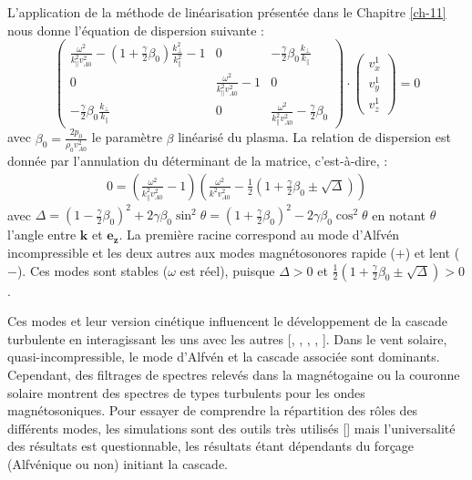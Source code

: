 L'application de la méthode de linéarisation présentée dans le Chapitre \ref{ch-11} nous donne l'équation de dispersion suivante :
\begin{equation}
    \begin{pmatrix}
\label{eq:lin_cpi_eqdis}    \frac{\omega^2}{k^2_{\parallel} v^2_{A0}} - \left(1+\frac{\gamma}{2} \beta_0\right)  \frac{k^2_{\perp}}{k^2_{\parallel}} - 1 & 0 & - \frac{\gamma}{2} \beta_0  \frac{k_{\perp}}{k_{\parallel}} \\
    0 & \frac{\omega^2}{k^2_{\parallel} v^2_{A0}} - 1  & 0 \\
     - \frac{\gamma}{2} \beta_0  \frac{k_{\perp}}{k_{\parallel}}  & 0 &\frac{\omega^2}{k^2_{\parallel} v^2_{A0}} -  \frac{\gamma}{2} \beta_0   
    \end{pmatrix} 
    \cdot \begin{pmatrix}
    v^{1}_x \\ v^{1}_y \\ v^{1}_z
    \end{pmatrix} = 0
\end{equation}
avec $\beta_0 = \frac{2p_0}{\rho_0 v^2_{A0}}$ le paramètre $\beta$ linéarisé du plasma. 
La relation de dispersion est donnée par l'annulation du déterminant de la matrice, c'est-à-dire, :
\begin{eqnarray}
 \label{eq:lin_cpi_disp}   0 = \left(\frac{\omega^2}{k^2_{\parallel} v^2_{A0}} - 1 \right)\left(\frac{\omega^2}{k^2 v^2_{A0}} - \frac{1}{2} \left(1+ \frac{\gamma}{2} \beta_0 \pm \sqrt{\Delta}\right)\right)
\end{eqnarray}
avec $\Delta = \left(1- \frac{\gamma}{2} \beta_0\right)^2 +2 \gamma \beta_0\sin^2\theta  = \left(1+ \frac{\gamma}{2} \beta_0\right)^2 -2 \gamma \beta_0\cos^2\theta$ en notant $\theta$ l'angle entre $\boldsymbol{k}$ et $\boldsymbol{e_z}$. La première racine correspond au mode d'Alfvén incompressible et les deux autres aux modes magnétosonores rapide ($+$) et lent ($-$). Ces modes sont stables ($\omega$ est réel), puisque $\Delta > 0$ et $\frac{1}{2} \left(1+ \frac{\gamma}{2} \beta_0 \pm \sqrt{\Delta}\right)>0$. 

Ces modes et leur version cinétique influencent le développement de la cascade turbulente en interagissant les uns avec les autres [\cite{cho_compressible_2003}, \cite{sharma_nonlinear_2011}, \cite{andres_interplay_2017}, \cite{brodiano_spatiotemporal_2021}, \cite{galtier_fast_2023}]. Dans le vent solaire, quasi-incompressible, le mode d'Alfvén et la cascade associée sont dominants. Cependant, des filtrages de spectres relevés dans la magnétogaine ou la couronne solaire montrent des spectres de types turbulents pour les ondes magnétosoniques. Pour essayer de comprendre la répartition des rôles des différents modes, les simulations sont des outils très utilisés [\cite{brodiano_spatiotemporal_2021}] mais l'universalité des résultats est questionnable, les résultats étant dépendants du forçage (Alfvénique ou non) initiant la cascade.  

